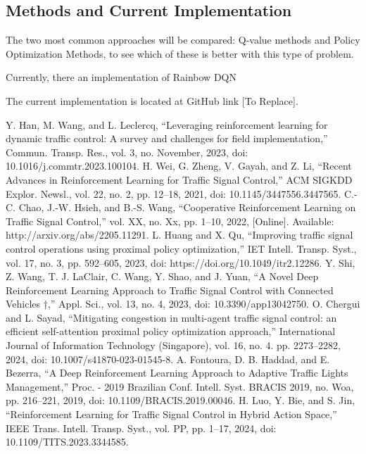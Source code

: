 \documentclass{Supervised_Reinforcement_Learningqsport}
\begin{document}
\subsection{Methods and Current Implementation}

The two most common approaches will be compared: Q-value methods and Policy Optimization Methods, to see which of these is better with this type of problem.

Currently, there an implementation of Rainbow DQN 

The current implementation is located at GitHub link [To Replace].

\begin{thebibliography}{99}

 Y. Han, M. Wang, and L. Leclercq, “Leveraging reinforcement learning for dynamic traffic control: A survey and challenges for field implementation,” Commun. Transp. Res., vol. 3, no. November, 2023, doi: 10.1016/j.commtr.2023.100104.
 H. Wei, G. Zheng, V. Gayah, and Z. Li, “Recent Advances in Reinforcement Learning for Traffic Signal Control,” ACM SIGKDD Explor. Newsl., vol. 22, no. 2, pp. 12–18, 2021, doi: 10.1145/3447556.3447565.
 C.-C. Chao, J.-W. Hsieh, and B.-S. Wang, “Cooperative Reinforcement Learning on Traffic Signal Control,” vol. XX, no. Xx, pp. 1–10, 2022, [Online]. Available: http://arxiv.org/abs/2205.11291.
 L. Huang and X. Qu, “Improving traffic signal control operations using proximal policy optimization,” IET Intell. Transp. Syst., vol. 17, no. 3, pp. 592–605, 2023, doi: https://doi.org/10.1049/itr2.12286.
 Y. Shi, Z. Wang, T. J. LaClair, C. Wang, Y. Shao, and J. Yuan, “A Novel Deep Reinforcement Learning Approach to Traffic Signal Control with Connected Vehicles †,” Appl. Sci., vol. 13, no. 4, 2023, doi: 10.3390/app13042750.
 O. Chergui and L. Sayad, “Mitigating congestion in multi-agent traffic signal control: an efficient self-attention proximal policy optimization approach,” International Journal of Information Technology (Singapore), vol. 16, no. 4. pp. 2273–2282, 2024, doi: 10.1007/s41870-023-01545-8.
 A. Fontoura, D. B. Haddad, and E. Bezerra, “A Deep Reinforcement Learning Approach to Adaptive Traffic Lights Management,” Proc. - 2019 Brazilian Conf. Intell. Syst. BRACIS 2019, no. Woa, pp. 216–221, 2019, doi: 10.1109/BRACIS.2019.00046.
 H. Luo, Y. Bie, and S. Jin, “Reinforcement Learning for Traffic Signal Control in Hybrid Action Space,” IEEE Trans. Intell. Transp. Syst., vol. PP, pp. 1–17, 2024, doi: 10.1109/TITS.2023.3344585.

\end{thebibliography}
\end{document}
